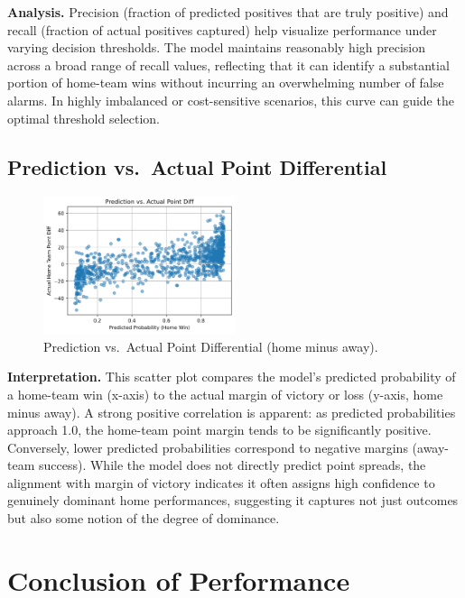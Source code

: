 \documentclass[12pt]{article}
\begin{document}
\noindent
\textbf{Analysis.}
Precision (fraction of predicted positives that are truly positive) and recall (fraction of actual positives captured) help visualize performance under varying decision thresholds. The model maintains reasonably high precision across a broad range of recall values, reflecting that it can identify a substantial portion of home-team wins without incurring an overwhelming number of false alarms. In highly imbalanced or cost-sensitive scenarios, this curve can guide the optimal threshold selection. 

\subsection{Prediction vs.\ Actual Point Differential}
\begin{figure}[H]
\centering
\includegraphics[width=0.5\textwidth]{graph_prediction_vs_actual.png}
\caption{Prediction vs.\ Actual Point Differential (home minus away).}
\label{fig:prediction_vs_actual}
\end{figure}

\noindent
\textbf{Interpretation.}
This scatter plot compares the model’s predicted probability of a home-team win (x-axis) to the actual margin of victory or loss (y-axis, home minus away). A strong positive correlation is apparent: as predicted probabilities approach 1.0, the home-team point margin tends to be significantly positive. Conversely, lower predicted probabilities correspond to negative margins (away-team success). While the model does not directly predict point spreads, the alignment with margin of victory indicates it often assigns high confidence to genuinely dominant home performances, suggesting it captures not just outcomes but also some notion of the degree of dominance.

\section{Conclusion of Performance}
\label{sec:results_synthesis}
\end{document}
